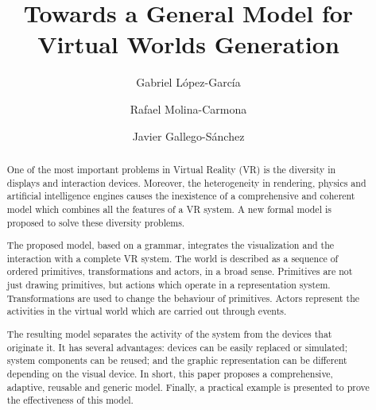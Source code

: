 \documentclass[twocolumn]{svjour3}
\begin{document}
\title{Towards a General Model for Virtual Worlds Generation}


\author{Gabriel L\'opez-Garc\'ia \and
        Rafael Molina-Carmona \and
        Javier Gallego-S\'anchez}


\maketitle



\begin{abstract}
One of the most important problems in Virtual Reality (VR) is the diversity in displays and interaction devices. Moreover, the heterogeneity in rendering, physics and artificial intelligence engines causes the inexistence of a comprehensive and coherent model which combines all the features of a VR system. A new formal model is proposed to solve these diversity problems.

The proposed model, based on a grammar, integrates the visualization and the interaction with a complete VR system. The world is described as a sequence of ordered primitives, transformations and actors, in a broad sense. Primitives are not just drawing primitives, but actions which operate in a representation system. Transformations are used to change the behaviour of primitives. Actors represent the activities in the virtual world which are carried out through events.

The resulting model separates the activity of the system from the devices that originate it. It has several advantages: devices can be easily replaced or simulated; system components can be reused; and the graphic representation can be different depending on the visual device. In short, this paper proposes a comprehensive, adaptive, reusable and generic model. Finally, a practical example is presented to prove the effectiveness of this model.


\end{abstract}
\end{document}
